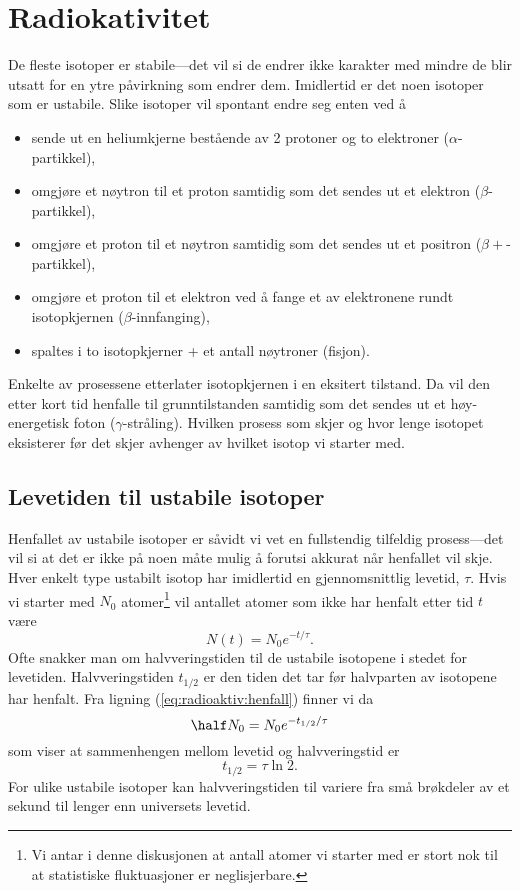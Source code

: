 \chapter{Radiokativitet}
De fleste isotoper er stabile---det vil si de endrer ikke karakter med mindre de blir utsatt for en ytre påvirkning som endrer dem. Imidlertid er det noen isotoper som er ustabile. Slike isotoper vil spontant endre seg enten ved å
\begin{itemize}
\item
sende ut en heliumkjerne bestående av 2 protoner og to elektroner ($\alpha$-partikkel),
\item
omgjøre et nøytron til et proton samtidig som det sendes ut et elektron ($\beta$-partikkel),
\item
omgjøre et proton til et nøytron samtidig som det sendes ut et positron ($\beta+$-partikkel),
\item
omgjøre et proton til et elektron ved å fange et av elektronene rundt isotopkjernen ($\beta$-innfanging),
\item
spaltes i to isotopkjerner + et antall nøytroner (fisjon).
\end{itemize}
Enkelte av prosessene etterlater isotopkjernen i en eksitert tilstand. Da vil den etter kort tid henfalle til grunntilstanden samtidig som det sendes ut et høy-energetisk foton ($\gamma$-stråling). Hvilken prosess som skjer og hvor lenge isotopet eksisterer før det skjer avhenger av hvilket isotop vi starter med.

\section{Levetiden til ustabile isotoper}
Henfallet av ustabile isotoper er såvidt vi vet en fullstendig tilfeldig prosess---det vil si at det er ikke på noen måte mulig å forutsi akkurat når henfallet vil skje. Hver enkelt type ustabilt isotop har imidlertid en gjennomsnittlig levetid, $\tau$.  Hvis vi starter med $N_0$ atomer\footnote{Vi antar i denne diskusjonen at antall atomer vi starter med er stort nok til at statistiske fluktuasjoner er neglisjerbare.} vil antallet atomer som ikke har henfalt etter tid $t$ være
\begin{equation}
	N(t) = N_0e^{-t/\tau}.
	\label{eq:radioaktiv:henfall}
\end{equation}
Ofte snakker man om halvveringstiden til de ustabile isotopene i stedet for levetiden. Halvveringstiden $t_{1/2}$ er den tiden det tar før halvparten av isotopene har henfalt. Fra ligning (\ref{eq:radioaktiv:henfall}) finner vi da
\begin{displaymath}
	\half N_0 = N_0e^{-t_{1/2}/\tau}
\end{displaymath}
som viser at sammenhengen mellom levetid og halvveringstid er
\begin{equation}
	t_{1/2} = \tau\ln 2.
\end{equation}
For ulike ustabile isotoper kan halvveringstiden til variere fra små brøkdeler av et sekund til lenger enn universets levetid. 


